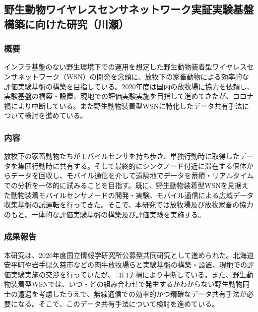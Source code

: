 \subsection{野生動物ワイヤレスセンサネットワーク実証実験基盤構築に向けた研究（川瀬）}
\subsubsection{概要}
インフラ基盤のない野生環境下での運用を想定した野生動物装着型ワイヤレスセンサネットワーク（WSN）の開発を念頭に、放牧下の家畜動物による効率的な評価実験基盤の構築を目指している。2020年度は国内の放牧場に協力を依頼し、実験基盤の構築・設置、現地での評価実験実施を目指して進めてきたが、コロナ禍により中断している。また野生動物装着型WSNに特化したデータ共有手法について検討を進めている。
\subsubsection{内容}
放牧下の家畜動物たちがモバイルセンサを持ち歩き、単独行動時に取得したデータを集団行動時に共有する。そして最終的にシンクノード付近に滞在する個体からデータを回収し、モバイル通信を介して遠隔地でデータを蓄積・リアルタイムでの分析を一体的に試みることを目指す。既に、野生動物装着型WSNを見据えた動物装着モバイルセンサノードの開発・実験、モバイル通信による広域データ収集基盤の試運転を行ってきた。そこで、本研究では放牧場及び放牧家畜の協力のもと、一体的な評価実験基盤の構築及び評価実験を実施する。
\subsubsection  {成果報告}
本研究は、2020年度国立情報学研究所公募型共同研究として進められた。北海道安平町や岩手県久慈市などの肉牛放牧場らと実験基盤の構築・設置、現地での評価実験実施の交渉を行っていたが、コロナ禍により中断している。また、野生動物装着型WSNでは、いつ・どの組み合わせで発生するかわからない野生動物同士の遭遇を考慮したうえで、無線通信での効率的かつ精確なデータ共有手法が必要になる。そこで、このデータ共有手法について検討を進めている。
